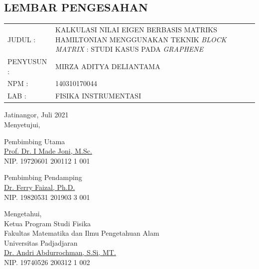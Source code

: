 \documentclass[12pt,a4paper]{report}
\begin{document}
\begin{onehalfspacing}

\chapter*{\centering LEMBAR PENGESAHAN}
\thispagestyle{empty}
\begin{tabular}{p{3cm}p{11cm}}
JUDUL \hspace{1.4cm}:&  KALKULASI NILAI EIGEN BERBASIS MATRIKS HAMILTONIAN MENGGUNAKAN TEKNIK \textit{BLOCK MATRIX} : STUDI KASUS PADA \textit{GRAPHENE} \\
PENYUSUN \hspace{0.5cm}:&  MIRZA ADITYA DELIANTAMA \\
NPM \hspace{1.83cm}:&  140310170044 \\
LAB \hspace{1.89cm}:&  FISIKA INSTRUMENTASI \\
\end{tabular}
\vspace{1cm}
\begin{center}
Jatinangor, Juli 2021 \\
Menyetujui, \\
\begin{multicols}{2}
	{Pembimbing Utama \\
	\vspace{3cm}
	\underline{Prof. Dr. I Made Joni, M.Sc.} \\
	NIP. 19720601 200112 1 001 \\}

	{Pembimbing Pendamping \\
	\vspace{3cm}
	\underline{Dr. Ferry Faizal, Ph.D.} \\
	NIP. 19820531 201903 3 001\\}
\end{multicols}
\vspace{1cm}
Mengetahui, \\
Ketua Program Studi Fisika \\
Fakultas Matematika dan Ilmu Pengetahuan Alam \\
Universitas Padjadjaran \\
\vspace{3cm}
\underline{Dr. Andri Abdurrochman, S.Si, MT.} \\
NIP. 19740526 200312 1 002 \\

\end{center}
\end{onehalfspacing}
\end{document}
